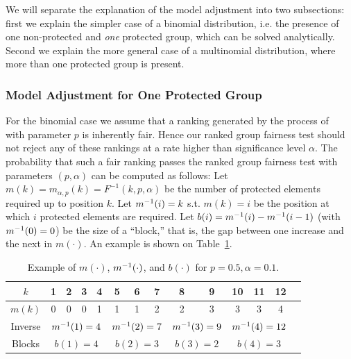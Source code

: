 We will separate the explanation of the model adjustment into two subsections: first we explain the simpler case of a binomial distribution, i.e. the presence of one non-protected and \emph{one} protected group, which can be solved analytically.
%
Second we explain the more general case of a multinomial distribution, where more than one protected group is present.

\subsubsection{Model Adjustment for One Protected Group}\label{subsubsec:adjustment-binomial}
For the binomial case we assume that a ranking generated by the process of~\citet{yang2016measuring} with parameter $p$ is inherently fair.
%
Hence our ranked group fairness test should not reject any of these rankings at a rate higher than significance level $\alpha$.
%
The probability that such a fair ranking passes the ranked group fairness test with parameters $(p,\alpha)$ can be computed as follows:
%
Let $m(k) = m_{\alpha,p}(k) = F^{-1}(k,p,\alpha)$ be the number of protected elements required up to position $k$.
%
Let $m^{-1}(i) = k$ s.t. $m(k) = i$ be the position at which $i$ protected elements are required.
%
Let $b(i) = m^{-1}(i) - m^{-1}(i-1)$ (with $m^{-1}(0) = 0$) be the size of a ``block,'' that is, the gap between one increase and the next in $m(\cdot)$.
%
An example is shown on Table~\ref{tbl:example_mtable}.
%
\begin{table}[h]
	\caption{Example of $m(\cdot)$, $m^{-1}(\cdot)$, and $b(\cdot)$ for $p=0.5, \alpha=0.1$.}
	\vspace{-3mm}
	\label{tbl:example_mtable}
	{\small
		\begin{tabular}{cccccccccccccc}\toprule
			$k$    & 1 & 2 & 3 & {\bf 4} & 5 & 6 & {\bf 7} & 8 & {\bf 9} & 10 & 11 & {\bf 12} \\
			\midrule
			$m(k)$ & 0 & 0 & 0 & \multicolumn{1}{c|}{1} & 1 & 1 & \multicolumn{1}{c|}{2} & 2 & \multicolumn{1}{c|}{3} & 3  & 3  & \multicolumn{1}{c}{4}\\
			Inverse   & \multicolumn{4}{c|}{$m^{-1}(1)=4$}
			& \multicolumn{3}{c|}{$m^{-1}(2)=7$}
			& \multicolumn{2}{c|}{$m^{-1}(3)=9$}
			& \multicolumn{3}{c}{$m^{-1}(4)=12$}\\
			Blocks       & \multicolumn{4}{c|}{$b(1)=4$}
			& \multicolumn{3}{c|}{$b(2)=3$}
			& \multicolumn{2}{c|}{$b(3)=2$}
			& \multicolumn{3}{c}{$b(4)=3$}\\\bottomrule
		\end{tabular}
	}
\end{table}

